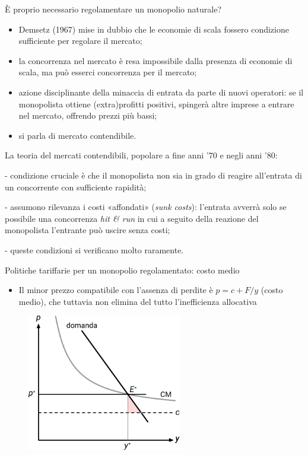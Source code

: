 \documentclass[aspectratio=64,12pt]{beamer}
\begin{document}
\begin{frame}{È proprio necessario regolamentare un monopolio naturale?}
\begin{itemize}
\item Demsetz (1967) mise in dubbio che le economie di scala fossero condizione
\alert{sufficiente} per regolare il mercato;
\item la concorrenza \alert{nel} mercato è resa impossibile dalla presenza di
economie di scala, ma può esserci concorrenza \alert{per il} mercato;
\item azione disciplinante della minaccia di entrata da parte di nuovi operatori: se il monopolista ottiene (extra)profitti positivi, spingerà altre imprese a
entrare nel mercato, offrendo prezzi più bassi;
\item si parla di \alert{mercato contendibile}.
\end{itemize}
\begin{block}{}
  \small
  La \alert{teoria del mercati contendibili}, popolare a fine anni
  '70 e negli anni '80:
  
- condizione cruciale è che il monopolista non sia in grado di reagire
  all'entrata di un concorrente con sufficiente rapidità;

- assumono rilevanza i costi «affondati» (\emph{sunk costs}): l'entrata avverrà
solo se possibile una concorrenza \emph{hit \& run} in cui a seguito della
reazione del monopolista l'entrante può uscire senza costi;

- queste condizioni si verificano molto raramente.

\end{block}
\end{frame}

\begin{frame}{Politiche tariffarie per un monopolio regolamentato: costo medio}
\begin{itemize}
\item Il minor prezzo compatibile con l'assenza di perdite è $p=c+F/y$ (\alert{costo medio}),
che tuttavia non elimina del tutto l'inefficienza allocativa
\end{itemize}

\begin{figure}[htbp]
\centering
\includegraphics[height=6cm]{./figure/monopolio-naturale-4-color.pdf}
\end{figure}
\end{frame}
\end{document}
